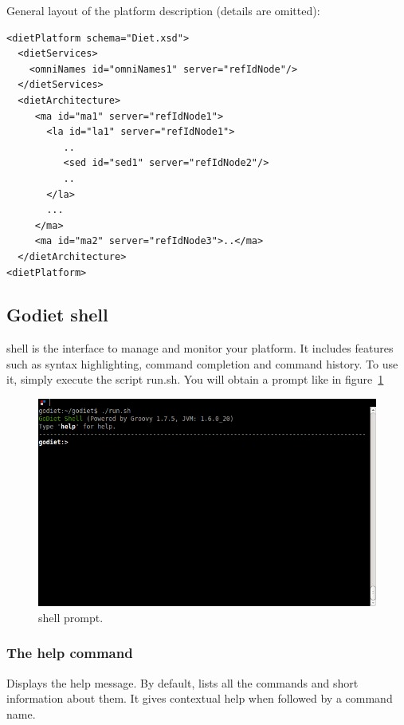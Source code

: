 \vspace{1cm}

General layout of the \diet platform description (details are omitted):
\begin{verbatim}
<dietPlatform schema="Diet.xsd">
  <dietServices>
    <omniNames id="omniNames1" server="refIdNode"/>
  </dietServices>
  <dietArchitecture>
     <ma id="ma1" server="refIdNode1">
       <la id="la1" server="refIdNode1">
          ..
          <sed id="sed1" server="refIdNode2"/>
          ..
       </la>
       ...
     </ma>
     <ma id="ma2" server="refIdNode3">..</ma>
  </dietArchitecture>
<dietPlatform>
\end{verbatim}


\subsection{Godiet shell}
\label{GODIETShell}

\godiet shell is the interface to manage and monitor your \diet platform. It includes features such as syntax highlighting, command completion and command history.
To use it, simply execute the script run.sh. You will obtain a prompt like in figure~\ref{fig:GODIETShell}

\begin{figure}[h]
  \centering
  \includegraphics[width=12cm]{fig/1-startup}
  \caption{\godiet shell prompt.\label{fig:GODIETShell}}
\end{figure} 

\subsubsection{The help command}

Displays the help message. By default, lists all the commands and short information about them. It gives contextual help when followed by a command name.

